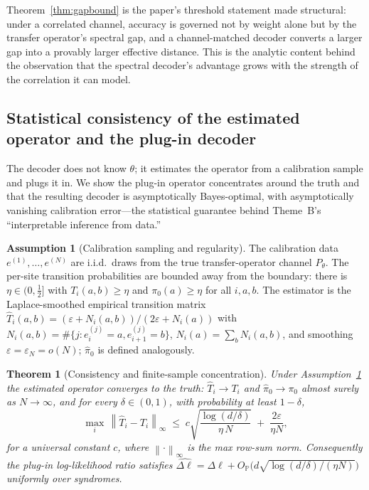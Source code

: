 \documentclass[reprint,aps,prxquantum,amsmath,amssymb,floatfix,nofootinbib,longbibliography]{revtex4-2}
\newtheorem{theorem}{Theorem}
\theoremstyle{definition}
\newtheorem{assumption}{Assumption}
\theoremstyle{remark}
\theoremstyle{plain}
\newcommand{\PP}{\mathbb{P}}
\newcommand{\eps}{\varepsilon}
\newcommand{\norm}[1]{\left\lVert #1 \right\rVert}
\begin{document}
Theorem~\ref{thm:gapbound} is the paper's threshold statement made structural:
under a correlated channel, accuracy is governed not by weight alone but by the
transfer operator's spectral gap, and a channel-matched decoder converts a
larger gap into a provably larger effective distance. This is the analytic
content behind the observation that the spectral decoder's advantage grows with
the strength of the correlation it can model.

\subsection{Statistical consistency of the estimated operator and the plug-in decoder}
\label{sec:bayes_consistency}

The decoder does not know $\theta$; it estimates the operator from a
calibration sample and plugs it in. We show the plug-in operator concentrates
around the truth and that the resulting decoder is asymptotically
Bayes-optimal, with asymptotically vanishing calibration error---the statistical
guarantee behind Theme~B's ``interpretable inference from data.''

\begin{assumption}[Calibration sampling and regularity]
\label{ass:calib}
The calibration data $e^{(1)},\dots,e^{(N)}$ are i.i.d.\ draws from the true
transfer-operator channel $P_\theta$. The per-site transition probabilities are
bounded away from the boundary: there is $\eta\in(0,\tfrac12]$ with
$T_i(a,b)\ge\eta$ and $\pi_0(a)\ge\eta$ for all $i,a,b$. The estimator is the
Laplace-smoothed empirical transition matrix
$\hat T_i(a,b)=(\eps+N_i(a,b))/(2\eps+N_i(a))$ with
$N_i(a,b)=\#\{j:e^{(j)}_i=a,e^{(j)}_{i+1}=b\}$, $N_i(a)=\sum_bN_i(a,b)$, and
smoothing $\eps=\eps_N=o(N)$; $\hat\pi_0$ is defined analogously.
\end{assumption}

\begin{theorem}[Consistency and finite-sample concentration]
\label{thm:consistency}
Under Assumption~\ref{ass:calib} the estimated operator converges to the truth:
$\hat T_i\to T_i$ and $\hat\pi_0\to\pi_0$ almost surely as $N\to\infty$, and
for every $\delta\in(0,1)$, with probability at least $1-\delta$,
\begin{equation}
  \max_{i}\,\norm{\hat T_i-T_i}_{\infty}
    \;\le\; c\sqrt{\frac{\log(d/\delta)}{\eta\,N}}\;+\;\frac{2\eps}{\eta N},
  \label{eq:concentration}
\end{equation}
for a universal constant $c$, where $\norm{\cdot}_\infty$ is the max
row-sum norm. Consequently the plug-in log-likelihood ratio satisfies
$\hat{\Delta\ell}=\Delta\ell+O_{\PP}\!\bigl(d\sqrt{\log(d/\delta)/(\eta N)}\bigr)$
uniformly over syndromes.
\end{theorem}
\end{document}

